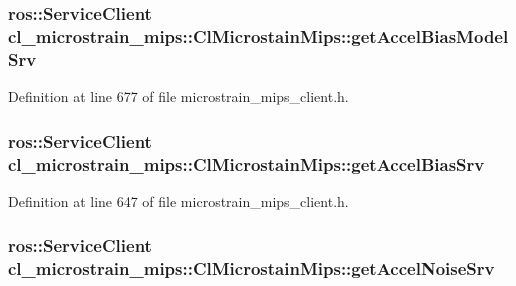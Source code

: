 \subsubsection[{\texorpdfstring{get\+Accel\+Bias\+Model\+Srv}{getAccelBiasModelSrv}}]{\setlength{\rightskip}{0pt plus 5cm}ros\+::\+Service\+Client cl\+\_\+microstrain\+\_\+mips\+::\+Cl\+Microstain\+Mips\+::get\+Accel\+Bias\+Model\+Srv\hspace{0.3cm}{\ttfamily [protected]}}\hypertarget{classcl__microstrain__mips_1_1ClMicrostainMips_a5516ee2ad71621f728245d0854104dc7}{}\label{classcl__microstrain__mips_1_1ClMicrostainMips_a5516ee2ad71621f728245d0854104dc7}


Definition at line 677 of file microstrain\+\_\+mips\+\_\+client.\+h.

\subsubsection[{\texorpdfstring{get\+Accel\+Bias\+Srv}{getAccelBiasSrv}}]{\setlength{\rightskip}{0pt plus 5cm}ros\+::\+Service\+Client cl\+\_\+microstrain\+\_\+mips\+::\+Cl\+Microstain\+Mips\+::get\+Accel\+Bias\+Srv\hspace{0.3cm}{\ttfamily [protected]}}\hypertarget{classcl__microstrain__mips_1_1ClMicrostainMips_a79547e77f9122ca67610f153657ec8ac}{}\label{classcl__microstrain__mips_1_1ClMicrostainMips_a79547e77f9122ca67610f153657ec8ac}


Definition at line 647 of file microstrain\+\_\+mips\+\_\+client.\+h.

\subsubsection[{\texorpdfstring{get\+Accel\+Noise\+Srv}{getAccelNoiseSrv}}]{\setlength{\rightskip}{0pt plus 5cm}ros\+::\+Service\+Client cl\+\_\+microstrain\+\_\+mips\+::\+Cl\+Microstain\+Mips\+::get\+Accel\+Noise\+Srv\hspace{0.3cm}{\ttfamily [protected]}}\hypertarget{classcl__microstrain__mips_1_1ClMicrostainMips_ae34d6cfd5e2e990d2fa3afab20ca9c01}{}\label{classcl__microstrain__mips_1_1ClMicrostainMips_ae34d6cfd5e2e990d2fa3afab20ca9c01}


